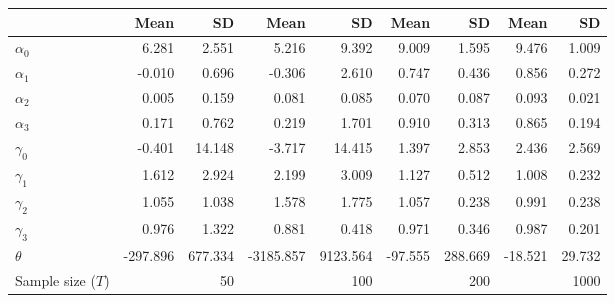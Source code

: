 
\begin{tabular}[t]{lrrrrrrrr}
\toprule
  & Mean & SD & Mean  & SD  & Mean   & SD   & Mean    & SD   \\
\midrule
$\alpha_{0}$ & 6.281 & 2.551 & 5.216 & 9.392 & 9.009 & 1.595 & 9.476 & 1.009\\
$\alpha_{1}$ & -0.010 & 0.696 & -0.306 & 2.610 & 0.747 & 0.436 & 0.856 & 0.272\\
$\alpha_{2}$ & 0.005 & 0.159 & 0.081 & 0.085 & 0.070 & 0.087 & 0.093 & 0.021\\
$\alpha_{3}$ & 0.171 & 0.762 & 0.219 & 1.701 & 0.910 & 0.313 & 0.865 & 0.194\\
$\gamma_{0}$ & -0.401 & 14.148 & -3.717 & 14.415 & 1.397 & 2.853 & 2.436 & 2.569\\
$\gamma_{1}$ & 1.612 & 2.924 & 2.199 & 3.009 & 1.127 & 0.512 & 1.008 & 0.232\\
$\gamma_{2}$ & 1.055 & 1.038 & 1.578 & 1.775 & 1.057 & 0.238 & 0.991 & 0.238\\
$\gamma_{3}$ & 0.976 & 1.322 & 0.881 & 0.418 & 0.971 & 0.346 & 0.987 & 0.201\\
$\theta$ & -297.896 & 677.334 & -3185.857 & 9123.564 & -97.555 & 288.669 & -18.521 & 29.732\\
Sample size ($T$) &  & 50 &  & 100 &  & 200 &  & 1000\\
\bottomrule
\end{tabular}
